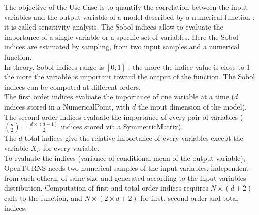 \renewcommand{\filename}{docUC_CentralUncertainty_SobolIndices.tex}
\renewcommand{\filetitle}{UC : Sensitivity analysis : Sobol indices}

\HeaderIIILevel

\label{SobolIndices}


The objective of the Use Case is to quantify the correlation between the input variables and the output variable of a model described by a numerical function : it is called sensitivity analysis. The Sobol indices allow to evaluate the importance of a single variable or a specific set of variables. Here the Sobol indices are estimated by sampling, from two input samples and a numerical function.\\
In theory, Sobol indices range is $\left[0; 1\right]$ ; the more the indice value is close to 1 the more the variable is important toward the output of the function. The Sobol indices can be computed at different orders.\\
The first order indices evaluate the importance of one variable at a time ($d$ indices stored in a NumericalPoint, with $d$ the input dimension of the model).\\
The second order indices evaluate the importance of every pair of variables ($\binom{d}{2} = \frac{d \times \left( d-1\right) }{2}$ indices stored via a SymmetricMatrix).\\
The $d$ total indices give the relative importance of every variables except the variable $X_i$, for every variable.\\

To evaluate the indices (variance of conditional mean of the output variable), OpenTURNS needs two numerical samples of the input variables, independent from each othern, of same size and generated according to the input variables distribution. Computation of first and total order indices requires $N \times (d+2)$ calls to the function, and $N \times (2 \times d + 2)$ for first, second order and total indices.


